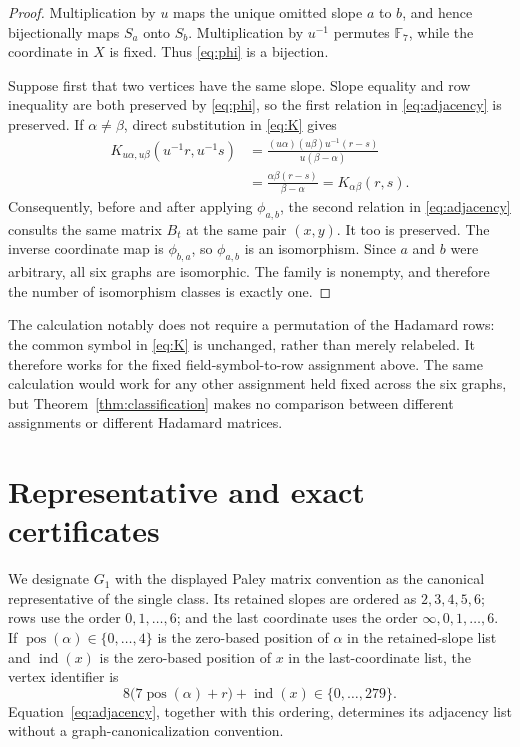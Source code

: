 \documentclass[11pt]{article}
\newcommand{\F}{\mathbb F}
\begin{document}
\begin{proof}
Multiplication by $u$ maps the unique omitted slope $a$ to $b$, and hence
bijectionally maps $S_a$ onto $S_b$.  Multiplication by $u^{-1}$ permutes
$\F_7$, while the coordinate in $X$ is fixed.  Thus \eqref{eq:phi} is a
bijection.

Suppose first that two vertices have the same slope.  Slope equality and row
inequality are both preserved by \eqref{eq:phi}, so the first relation in
\eqref{eq:adjacency} is preserved.  If $\alpha\ne\beta$, direct substitution
in \eqref{eq:K} gives
\begin{align*}
 K_{u\alpha,u\beta}(u^{-1}r,u^{-1}s)
 &=\frac{(u\alpha)(u\beta)u^{-1}(r-s)}{u(\beta-\alpha)}\\
 &=\frac{\alpha\beta(r-s)}{\beta-\alpha}
 =K_{\alpha\beta}(r,s).
\end{align*}
Consequently, before and after applying $\phi_{a,b}$, the second relation in
\eqref{eq:adjacency} consults the same matrix $B_t$ at the same pair $(x,y)$.
It too is preserved.  The inverse coordinate map is $\phi_{b,a}$, so
$\phi_{a,b}$ is an isomorphism.  Since $a$ and $b$ were arbitrary, all six
graphs are isomorphic.  The family is nonempty, and therefore the number of
isomorphism classes is exactly one.
\end{proof}

The calculation notably does not require a permutation of the Hadamard rows:
the common symbol in \eqref{eq:K} is unchanged, rather than merely relabeled.
It therefore works for the fixed field-symbol-to-row assignment above.  The
same calculation would work for any other assignment held fixed across the
six graphs, but Theorem~\ref{thm:classification} makes no comparison between
different assignments or different Hadamard matrices.

\section{Representative and exact certificates}

We designate $G_1$ with the displayed Paley matrix convention as the
canonical representative of the single class.  Its retained slopes are
ordered as $2,3,4,5,6$; rows use the order $0,1,\ldots,6$; and the last
coordinate uses the order $\infty,0,1,\ldots,6$.  If
$\operatorname{pos}(\alpha)\in\{0,\ldots,4\}$ is the zero-based position of
$\alpha$ in the retained-slope list and $\operatorname{ind}(x)$ is the
zero-based position of $x$ in the last-coordinate list, the vertex identifier
is
\[
 8\bigl(7\operatorname{pos}(\alpha)+r\bigr)
   +\operatorname{ind}(x)\in\{0,\ldots,279\}.
\]
Equation~\eqref{eq:adjacency}, together with this ordering, determines its
adjacency list without a graph-canonicalization convention.
\end{document}
